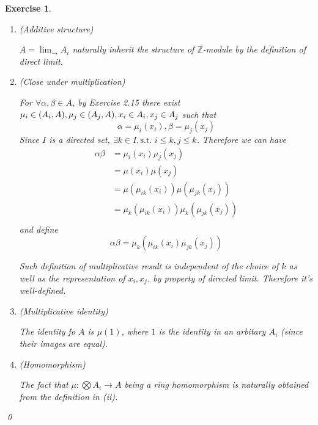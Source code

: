 \documentclass{article}
\theoremstyle{breakstyle}
\newtheorem{exercise}{Exercise}
\let\hom\relax
\DeclareMathOperator{\hom}{Hom}
\begin{document}
\begin{exercise}
    \leavevmode \vspace{-\baselineskip}
    \begin{enumerate}[label=({\roman*})]
        \item \emph{(Additive structure)}

            $A=\lim_{\rightarrow }A_{i}$ naturally inherit the structure of $\mathbb{Z}$-module by the definition of direct limit.
        \item \emph{(Close under multiplication)}

            For $\forall \alpha,\beta\in A$, by \emph{Exercise 2.15} there exist $\mu_{i}\in \hom(A_{i},A),\mu_{j}\in \hom(A_{j},A),x_{i}\in A_{i},x_{j}\in A_{j}$ such that
            $$
            \alpha=\mu_{i}(x_{i}),\beta=\mu_{j}(x_{j})
            $$
            Since $I$ is a directed set, $\exists k\in I,\text{s.t. }i\le k,j\le k$.
            Therefore we can have
            \begin{align*}
                \alpha\beta&= \mu_{i}(x_{i})\mu_{j}(x_{j}) \\
                &= \mu(x_{i})\mu({x_{j}}) \\
                &= \mu(\mu_{ik}(x_{i}))\mu(\mu_{jk}(x_{j})) \\
                &= \mu_{k}(\mu_{ik}(x_{i}))\mu_{k}(\mu_{jk}(x_{j})) \\
            \end{align*}
            and define
            $$
            \alpha\beta = \mu_{k}(\mu_{ik}(x_{i})\mu_{jk}(x_{j}))
            $$
            
            Such definition of multiplicative result is independent of the choice of $k$ as well as the representation of $x_{i},x_{j}$, by property of directed limit.
            Therefore it's well-defined.
        \item \emph{(Multiplicative identity)}

            The identity fo $A$ is $\mu(1)$, where $1$ is the identity in an arbitary $A_{i}$ (since their images are equal).
        \item \emph{(Homomorphism)}

            The fact that $\mu:\bigotimes A_{i}\longrightarrow A$ being a ring homomorphism is naturally obtained from the definition in \emph{(ii)}.
    \end{enumerate}
    \qed
\end{exercise}
\end{document}
